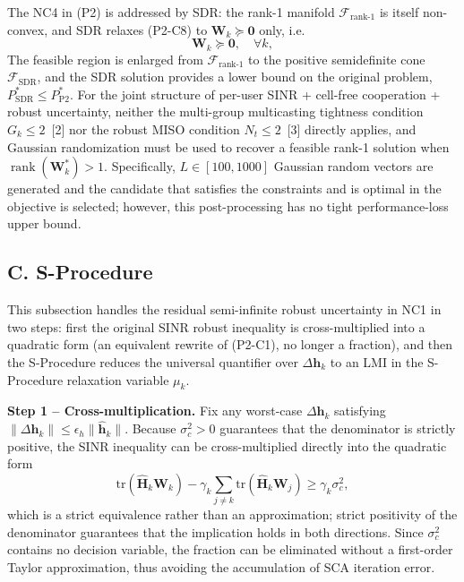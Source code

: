 \documentclass[12pt,a4paper]{article}
\newcommand{\vect}[1]{\mathbf{#1}}
\newcommand{\mat}[1]{\mathbf{#1}}
\newcommand{\tr}{\text{tr}}
\DeclareMathOperator{\rank}{rank}
\begin{document}
The NC4 in (P2) is addressed by SDR: the rank-1 manifold $\mathcal{F}_{\text{rank-1}}$ is itself non-convex, and SDR relaxes (P2-C8) to $\mat{W}_k \succeq \mat{0}$ only, i.e.
\begin{equation}
\mat{W}_k \succeq \mat{0}, \quad \forall k, \tag{S1.1}
\end{equation}
The feasible region is enlarged from $\mathcal{F}_{\text{rank-1}}$ to the positive semidefinite cone $\mathcal{F}_{\text{SDR}}$, and the SDR solution provides a lower bound on the original problem, $P_{\text{SDR}}^* \leq P_{\text{P2}}^*$. For the joint structure of per-user SINR + cell-free cooperation + robust uncertainty, neither the multi-group multicasting tightness condition $G_k \leq 2$~[2] nor the robust MISO condition $N_t \leq 2$~[3] directly applies, and Gaussian randomization must be used to recover a feasible rank-1 solution when $\rank(\mat{W}_k^*) > 1$. Specifically, $L \in [100, 1000]$ Gaussian random vectors are generated and the candidate that satisfies the constraints and is optimal in the objective is selected; however, this post-processing has no tight performance-loss upper bound.

\subsection*{C. S-Procedure}

This subsection handles the residual semi-infinite robust uncertainty in NC1 in two steps: first the original SINR robust inequality is cross-multiplied into a quadratic form (an equivalent rewrite of (P2-C1), no longer a fraction), and then the S-Procedure reduces the universal quantifier over $\Delta\vect{h}_k$ to an LMI in the S-Procedure relaxation variable $\mu_k$.

\textbf{Step 1 -- Cross-multiplication.} Fix any worst-case $\Delta\vect{h}_k$ satisfying $\|\Delta\vect{h}_k\| \leq \epsilon_h \|\hat{\vect{h}}_k\|$. Because $\sigma_c^2 > 0$ guarantees that the denominator is strictly positive, the SINR inequality can be cross-multiplied directly into the quadratic form
\begin{equation}
\tr(\hat{\mat{H}}_k \mat{W}_k) - \gamma_k \sum_{j \neq k} \tr(\hat{\mat{H}}_k \mat{W}_j) \geq \gamma_k \sigma_c^2, \tag{S2.1}
\end{equation}
which is a strict equivalence rather than an approximation; strict positivity of the denominator guarantees that the implication holds in both directions. Since $\sigma_c^2$ contains no decision variable, the fraction can be eliminated without a first-order Taylor approximation, thus avoiding the accumulation of SCA iteration error.
\end{document}
